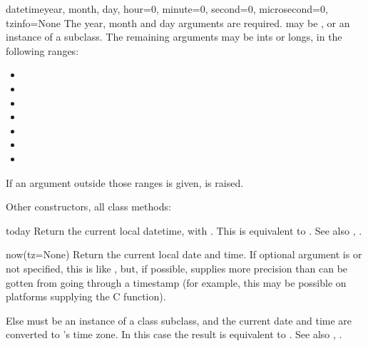 \begin{classdesc}{datetime}{year, month, day,
                            hour=0, minute=0, second=0, microsecond=0,
                            tzinfo=None}
  The year, month and day arguments are required.   may
  be , or an instance of a  subclass.  The
  remaining arguments may be ints or longs, in the following ranges:

  \begin{itemize}
    \item {}
    \item {}
    \item {}
    \item {}
    \item {}
    \item {}
    \item {}
  \end{itemize}

  If an argument outside those ranges is given,
   is raised.
\end{classdesc}

Other constructors, all class methods:

\begin{methoddesc}{today}{}
  Return the current local datetime, with  .
  This is equivalent to
  .
  See also , .
\end{methoddesc}

\begin{methoddesc}{now(tz=None)}{}
  Return the current local date and time.  If optional argument
   is  or not specified, this is like
  , but, if possible, supplies more precision than can
  be gotten from going through a  timestamp (for
  example, this may be possible on platforms supplying the C
   function).

  Else  must be an instance of a class  subclass,
  and the current date and time are converted to 's time
  zone.  In this case the result is equivalent to
  .
  See also , .
\end{methoddesc}

